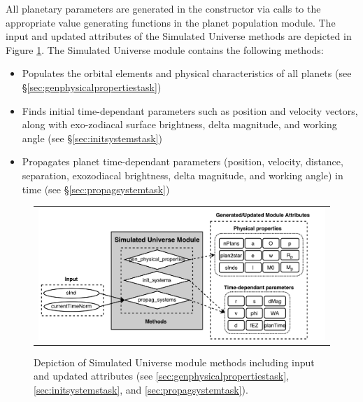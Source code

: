 \documentclass[cleanfoot]{asme2ej}
\newcommand{\reffig}[1]{Figure \ref{#1}}
\begin{document}
All planetary parameters are generated in the constructor via calls to the appropriate value generating functions in the planet population module. The input and updated attributes of the Simulated Universe methods are depicted in \reffig{fig:simulateduniversemodule}. The Simulated Universe module contains the following methods: 

\begin{itemize}[leftmargin=2in,font={\ttfamily}]
    \item[\texttt gen\_physical\_properties] Populates the orbital elements and physical characteristics of all planets (see \S\ref{sec:genphysicalpropertiestask})
    \item[\texttt init\_systems] Finds initial time-dependant parameters such as position and velocity vectors, along with exo-zodiacal surface brightness, delta magnitude, and working angle (see \S\ref{sec:initsystemstask}) 
    \item[\texttt propag\_system] Propagates planet time-dependant parameters (position, velocity, distance, separation, exozodiacal brightness, delta magnitude, and working angle) in time (see \S\ref{sec:propagsystemtask})
\end{itemize}

\begin{figure}[ht]
    \begin{center}
        \begin{tabular}{c}
             \includegraphics[width=\textwidth]{SimulatedUniverseTasks2}
        \end{tabular}
    \end{center}
    \caption{\label{fig:simulateduniversemodule} Depiction of Simulated Universe module methods including input and updated attributes (see \ref{sec:genphysicalpropertiestask}, \ref{sec:initsystemstask}, and \ref{sec:propagsystemtask}).}
\end{figure}
\end{document}
